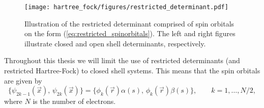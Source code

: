 \begin{figure}
 \begin{center}
  \texttt{[image: hartree\_fock/figures/restricted\_determinant.pdf]}
  \caption{Illustration of the restricted determinant comprised of spin orbitals on the form (\ref{eq:restricted_spinorbitals}).
  The left and right figures illustrate closed and open shell determinants, respectively.}
  \label{fig:restricted_determinant}
 \end{center}
\end{figure}

Throughout this thesis we will limit the use of restricted determinants (and restricted Hartree-Fock) to closed shell systems. This means that the
spin orbitals are given by
\begin{equation}
\label{eq:restricted_spinorbitals2}
 \{\psi_{2k-1}(\vec x),\,\psi_{2k}(\vec x)\} = \{\phi_k(\vec r)\alpha(s),\,\phi_k(\vec r)\beta(s)\}, \qquad k = 1,\dots,N/2,
\end{equation}
where $N$ is the number of electrons.


